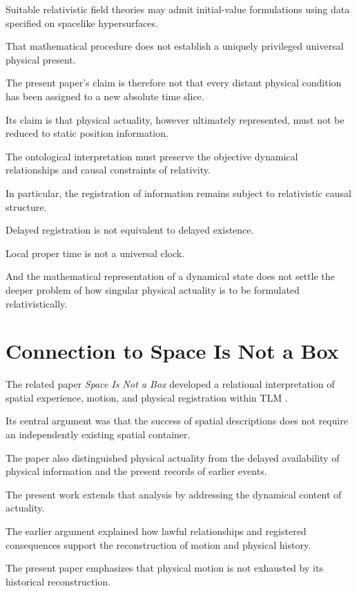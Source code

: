 \documentclass[12pt,onecolumn]{article}
\begin{document}
Suitable relativistic field theories may admit initial-value formulations using data specified on spacelike hypersurfaces.

That mathematical procedure does not establish a uniquely privileged universal physical present.

The present paper's claim is therefore not that every distant physical condition has been assigned to a new absolute time slice.

Its claim is that physical actuality, however ultimately represented, must not be reduced to static position information.

The ontological interpretation must preserve the objective dynamical relationships and causal constraints of relativity.

In particular, the registration of information remains subject to relativistic causal structure.

Delayed registration is not equivalent to delayed existence.

Local proper time is not a universal clock.

And the mathematical representation of a dynamical state does not settle the deeper problem of how singular physical actuality is to be formulated relativistically.


\section{Connection to Space Is Not a Box}

The related paper \emph{Space Is Not a Box} developed a relational interpretation of spatial experience, motion, and physical registration within TLM \cite{McKinleySpaceBox2026}.

Its central argument was that the success of spatial descriptions does not require an independently existing spatial container.

The paper also distinguished physical actuality from the delayed availability of physical information and the present records of earlier events.

The present work extends that analysis by addressing the dynamical content of actuality.

The earlier argument explained how lawful relationships and registered consequences support the reconstruction of motion and physical history.

The present paper emphasizes that physical motion is not exhausted by its historical reconstruction.
\end{document}
